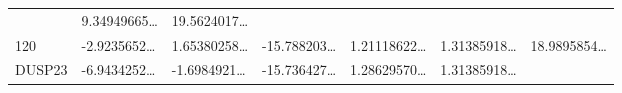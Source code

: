 \documentclass[
]{article}
\begin{document}
\begin{longtable}[]{@{}lllllll@{}}
\begin{minipage}[t]{0.12\columnwidth}
\end{minipage} & \begin{minipage}[t]{0.12\columnwidth}\raggedright
9.34949665\ldots{}\strut
\end{minipage} & \begin{minipage}[t]{0.12\columnwidth}\raggedright
19.5624017\ldots{}\strut
\end{minipage}\tabularnewline
\begin{minipage}[t]{0.08\columnwidth}\raggedright
120\strut
\end{minipage} & \begin{minipage}[t]{0.12\columnwidth}\raggedright
-2.9235652\ldots{}\strut
\end{minipage} & \begin{minipage}[t]{0.12\columnwidth}\raggedright
1.65380258\ldots{}\strut
\end{minipage} & \begin{minipage}[t]{0.12\columnwidth}\raggedright
-15.788203\ldots{}\strut
\end{minipage} & \begin{minipage}[t]{0.12\columnwidth}\raggedright
1.21118622\ldots{}\strut
\end{minipage} & \begin{minipage}[t]{0.12\columnwidth}\raggedright
1.31385918\ldots{}\strut
\end{minipage} & \begin{minipage}[t]{0.12\columnwidth}\raggedright
18.9895854\ldots{}\strut
\end{minipage}\tabularnewline
\begin{minipage}[t]{0.08\columnwidth}\raggedright
DUSP23\strut
\end{minipage} & \begin{minipage}[t]{0.12\columnwidth}\raggedright
-6.9434252\ldots{}\strut
\end{minipage} & \begin{minipage}[t]{0.12\columnwidth}\raggedright
-1.6984921\ldots{}\strut
\end{minipage} & \begin{minipage}[t]{0.12\columnwidth}\raggedright
-15.736427\ldots{}\strut
\end{minipage} & \begin{minipage}[t]{0.12\columnwidth}\raggedright
1.28629570\ldots{}\strut
\end{minipage} & \begin{minipage}[t]{0.12\columnwidth}\raggedright
1.31385918\ldots{}\strut
\end{minipage} & \begin{minipage}[t]{0.12\columnwidth}\raggedright

\end{minipage}
\end{longtable}
\end{document}
